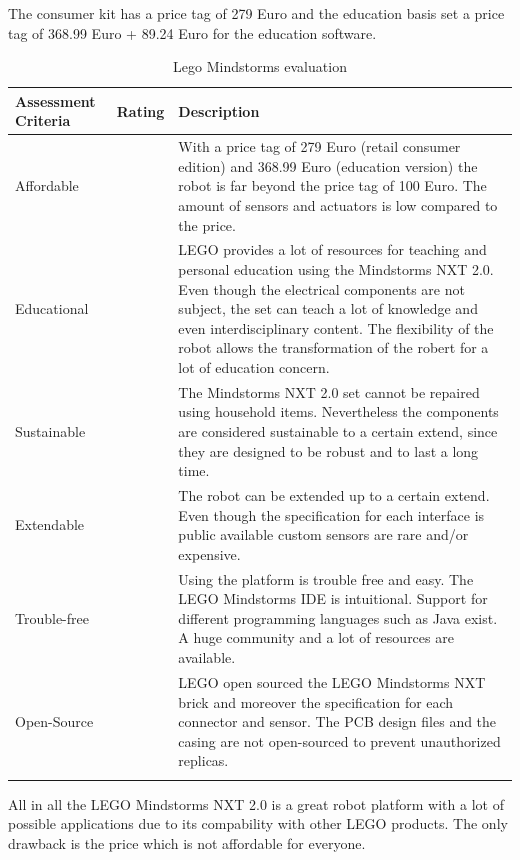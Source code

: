The consumer kit has a price tag of 279 Euro and the education basis set a price tag of 368.99 Euro + 89.24 Euro for the education software.

\begin{longtabu} to \textwidth { X[1,l] X[1,l] X[4,l]}
\toprule
Assessment Criteria    & Rating & Description \\
\midrule
Affordable  &     & With a price tag of 279 Euro (retail consumer edition) and 368.99 Euro (education version) the robot is far beyond the price tag of 100 Euro. The amount of sensors and actuators is low compared to the price.\\
Educational &      & LEGO provides a lot of resources for teaching and personal education using the Mindstorms NXT 2.0. Even though the electrical components are not subject, the set can teach a lot of knowledge and even interdisciplinary content. The flexibility of the robot allows the transformation of the robert for a lot of education concern. \\
Sustainable  &      & The Mindstorms NXT 2.0 set cannot be repaired using household items. Nevertheless the components are considered sustainable to a certain extend, since they are designed to be robust and to last a long time.\\
Extendable &  & The robot can be extended up to a certain extend. Even though the specification for each interface is public available custom sensors are rare and/or expensive. \\
Trouble-free &  & Using the platform is trouble free and easy. The LEGO Mindstorms IDE is intuitional. Support for different programming languages such as Java exist. A huge community and a lot of resources are available.\\
Open-Source &  & LEGO open sourced the LEGO Mindstorms NXT brick and moreover the specification for each connector and sensor. The PCB design files and the casing are not open-sourced to prevent unauthorized replicas.\\
\bottomrule
\caption{Lego Mindstorms evaluation}
\label{tbl:mindstorms_eval}
\end{longtabu}

All in all the LEGO Mindstorms NXT 2.0 is a great robot platform with a lot of possible applications due to its compability with other LEGO products. The only drawback is the price which is not affordable for everyone.

